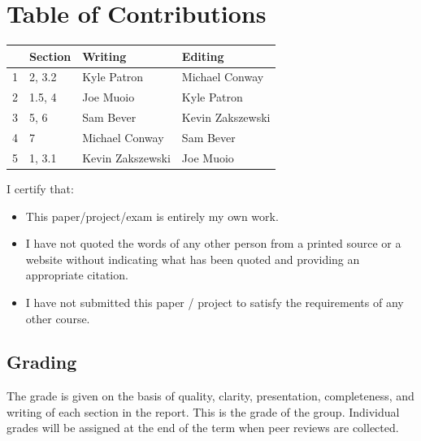 \documentclass{article}
\begin{document}
\newpage

\section*{\centering Table of Contributions}
\begin{tabular}{| l | l | l | l |}
    \hline
     & Section & Writing & Editing \\
    \hline \hline
		1 & 2, 3.2 & Kyle Patron & Michael Conway \\ \hline
		2 & 1.5, 4 & Joe Muoio & Kyle Patron \\ \hline
		3 & 5, 6 & Sam Bever &  Kevin Zakszewski \\ \hline
		4 & 7 & Michael Conway &  Sam Bever \\ \hline
		5 & 1, 3.1 & Kevin Zakszewski &  Joe Muoio \\ \hline
\end{tabular}
\newpage
\noindent I certify that:
\begin{itemize}
\item This paper/project/exam is entirely my own work.
\item I have not quoted the words of any other person from a printed source or a website without indicating what has been quoted and providing an appropriate citation.
\item I have not submitted this paper / project to satisfy the requirements of any other course.
\end{itemize}

\vspace{1cm}
\noindent{}


\vspace{0.5cm}
\noindent{}

\vspace{0.5cm}
\noindent{}

\vspace{0.5cm}
\noindent{}

\vspace{0.5cm}
\noindent{}

\vspace{\fill}
\subsection*{Grading}
The grade is given on the basis of quality, clarity, presentation, completeness, and writing of each section in the report. This is the grade of the group. Individual grades will be assigned at the end of the term when peer reviews are collected.
\end{document}
